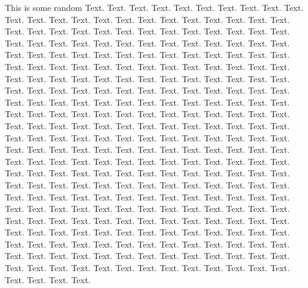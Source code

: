 \documentclass{book}
\begin{document}
This is some random Text. Text. Text. Text. Text. Text. Text. Text. Text. Text. Text. Text. Text. Text. Text. Text. Text. Text. Text. Text. Text. Text. Text. Text. Text. Text. Text. Text. Text. Text. Text. Text. Text. Text. Text. Text. Text. Text. Text. Text. Text. Text. Text. Text. Text. Text. Text. Text. Text. Text. Text. Text. Text. Text. Text. Text. Text. Text. Text. Text. Text. Text. Text. Text. Text. Text. Text. Text. Text. Text. Text. Text. Text. Text. Text. Text. Text. Text. Text. Text. Text. Text. Text. Text. Text. Text. Text. Text. Text. Text. Text. Text. Text. Text. Text. Text. Text. Text. Text. Text. Text. Text. Text. Text. Text. Text. Text. Text. Text. Text. Text. Text. Text. Text. Text. Text. Text. Text. Text. Text. Text. Text. Text. Text. Text. Text. Text. Text. Text. Text. Text. Text. Text. Text. Text. Text. Text. Text. Text. Text. Text. Text. Text. Text. Text. Text. Text. Text. Text. Text. Text. Text. Text. Text. Text. Text. Text. Text. Text. Text. Text. Text. Text. Text. Text. Text. Text. Text. Text. Text. Text. Text. Text. Text. Text. Text. Text. Text. Text. Text. Text. Text. Text. Text. Text. Text. Text. Text. Text. Text. Text. Text. Text. Text. Text. Text. Text. Text. Text. Text. Text. Text. Text. Text. Text. Text. Text. Text. Text. Text. Text. Text. Text. Text. Text. Text. Text. Text. Text. Text. Text. Text. Text. Text. Text. Text. Text. Text. Text. Text. Text. Text. Text. Text. Text. Text. Text. Text. Text. Text. Text. Text. Text. Text. Text. Text. Text. Text. Text. Text. Text. Text. Text. Text. Text. Text. Text. Text. Text. Text. Text. Text. Text. Text. Text. Text. Text. Text. Text. Text. Text. Text. Text. Text. Text. Text. Text. Text. Text. Text. Text. Text. Text. Text. Text. Text. Text. Text. Text. Text. Text. Text. Text. Text. Text. Text. Text. Text. Text. Text.
\end{document}
